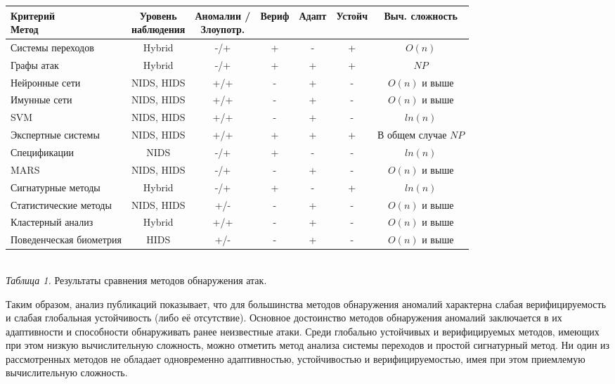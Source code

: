 {\footnotesize
\begin{center}
\begin{tabular}{ | l | c | c | c | c | c | c |}
	\hline
  \specialcell{      Критерий\\Метод} & \specialcell{Уровень\\наблюдения} & \specialcell{Аномалии / \\Злоупотр.} & Вериф & Адапт & Устойч & Выч. сложность \\ \hline
  Системы переходов & Hybrid & -/+ & + & - & + & $O(n)$ \\ \hline
  Графы атак & Hybrid & -/+ & + & + & + & $NP$ \\ \hline
  Нейронные сети & NIDS, HIDS & +/+ & - & + & - & $O(n)$ и выше \\ \hline
  Имунные сети & NIDS, HIDS & +/+ & - & + & - & $O(n)$ и выше \\ \hline
  SVM & NIDS, HIDS & +/+ & - & + & - & $ln(n)$\\ \hline
  Экспертные системы & NIDS, HIDS & +/+ & + & + & + & \specialcell{В общем случае\\$NP$}\\ \hline 
  Спецификации & NIDS & -/+ & + & - & - & $ln(n)$\\ \hline
  MARS & NIDS, HIDS & -/+ & - & + & - & $O(n)$ и выше \\ \hline
  Сигнатурные методы & Hybrid & -/+ & + & - & + & $ln(n)$ \\ \hline
  Статистические методы & NIDS, HIDS & +/- & - & + & - & $O(n)$ и выше \\ \hline
  Кластерный анализ & Hybrid & +/+ & - & + & - & $O(n)$ и выше \\ \hline
  Поведенческая биометрия & HIDS & +/- & - & + & - & $O(n)$ и выше \\ \hline
\end{tabular}\\
\textit{Таблица 1.} Результаты сравнения методов обнаружения атак.
\end{center} 
}

Таким образом, анализ публикаций показывает, что для большинства методов обнаружения аномалий характерна слабая верифицируемость и слабая глобальная устойчивость (либо её отсутствие). Основное достоинство методов обнаружения аномалий заключается в их адаптивности и способности обнаруживать ранее неизвестные атаки. Среди глобально устойчивых и верифицируемых методов, имеющих при этом низкую вычислительную сложность, можно отметить метод анализа системы переходов и простой сигнатурный метод. Ни один из рассмотренных методов не обладает одновременно адаптивностью, устойчивостью и верифицируемостью, имея при этом приемлемую вычислительную сложность.

